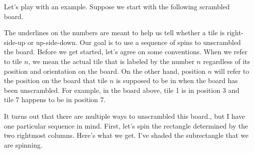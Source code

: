 \begin{example}\label{ex:spinpossible}
Let's play with an example.  Suppose we start with the following scrambled board.

\begin{center}
\end{center}

\noindent The underlines on the numbers are meant to help us tell whether a tile is right-side-up or up-side-down.  Our goal is to use a sequence of spins to unscrambled the board.  Before we get started, let's agree on some conventions.  When we refer to tile $n$, we mean the actual tile that is labeled by the number $n$ regardless of its position and orientation on the board.  On the other hand, position $n$ will refer to the position on the board that tile $n$ is supposed to be in when the board has been unscrambled.  For example, in the board above, tile 1 is in position 3 and tile 7 happens to be in position 7.  

It turns out that there are multiple ways to unscrambled this board., but I have one particular sequence in mind.  First, let's spin the rectangle determined by the two rightmost columns.  Here's what we get.  I've shaded the subrectangle that we are spinning.


\end{example}
